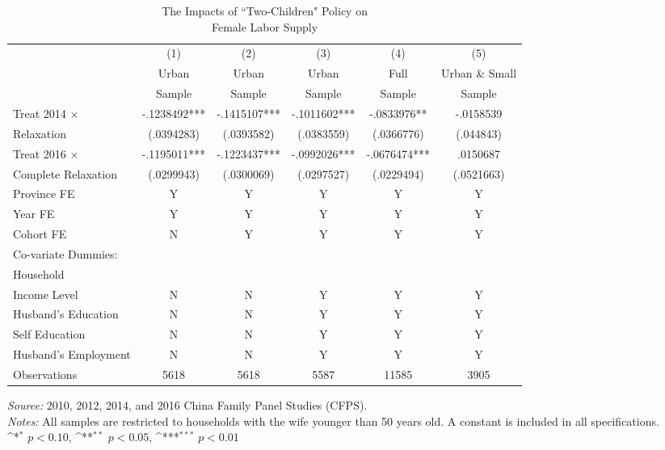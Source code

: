 \documentclass[12pt]{extarticle}
\begin{document}
\begin{landscape}
\begin{table}
\centering
\caption{The Impacts of ``Two-Children" Policy on \\ Female Labor Supply} \label{tab:mhasjob}
\begin{threeparttable}
\def\sym#1{\ifmmode^{#1}\else\(^{#1}\)\fi}
\begin{tabular}{l*{5}{c}}
\hline\hline
                    &\multicolumn{1}{c}{(1)}&\multicolumn{1}{c}{(2)}&\multicolumn{1}{c}{(3)}&\multicolumn{1}{c}{(4)}&\multicolumn{1}{c}{(5)}\\
	                &\multicolumn{1}{c}{Urban}&\multicolumn{1}{c}{Urban}&\multicolumn{1}{c}{Urban}&\multicolumn{1}{c}{Full}&\multicolumn{1}{c}{Urban \& Small}\\
		&\multicolumn{1}{c}{Sample}&\multicolumn{1}{c}{Sample}&\multicolumn{1}{c}{Sample}&\multicolumn{1}{c}{Sample}&\multicolumn{1}{c}{Sample}\\
\hline
Treat 2014 $\times$ &   -.1238492***&   -.1415107***&   -.1011602***&   -.0833976** &   -.0158539   \\
\quad 2014 Relaxation     &  (.0394283)   &  (.0393582)   &  (.0383559)   &  (.0366776)   &   (.044843)   \\
Treat 2016 $\times$ &   -.1195011***&   -.1223437***&   -.0992026***&   -.0676474***&    .0150687   \\
\quad Complete Relaxation &  (.0299943)   &  (.0300069)   &  (.0297527)   &  (.0229494)   &  (.0521663)   \\
\hline
Province FE &  Y &  Y & Y & Y & Y \\
Year FE &  Y &  Y & Y & Y & Y \\
Cohort FE & N & Y & Y & Y & Y \\
Co-variate Dummies: \\
\quad Household \\
\qquad Income Level & N & N & Y & Y & Y \\
\quad Husband's Education &  N &  N & Y & Y & Y \\
\quad Self Education &  N &  N & Y & Y & Y \\
\quad Husband's Employment &  N &  N & Y & Y & Y \\
\hline
Observations        &        5618   &        5618   &        5587   &       11585   &        3905   \\
\hline\hline
\end{tabular}
\begin{tablenotes}
\footnotesize \textit{Source:} 2010, 2012, 2014, and 2016 China Family Panel Studies (CFPS). \\
\textit{Notes:} All samples are restricted to households with the wife younger than 50 years old. A constant is included in all specifications. \\
\quad \sym{*} \(p<0.10\), \sym{**} \(p<0.05\), \sym{***} \(p<0.01\)
\end{tablenotes}
\end{threeparttable}
\end{table}
\end{landscape}
\end{document}

